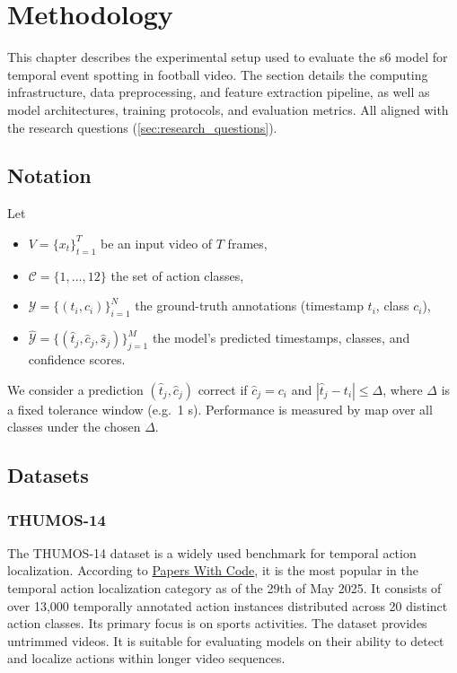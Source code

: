 \chapter{Methodology} 
\label{chap:methodology}
This chapter describes the experimental setup used to evaluate the \acrfull{s6} model for temporal event spotting in football video. The section details the computing infrastructure, data preprocessing, and feature extraction pipeline, as well as model architectures, training protocols, and evaluation metrics. All aligned with the research questions (\autoref{sec:research_questions}).



\section{Notation}
\label{sec:notation}
Let
\begin{itemize}
  \item $V=\{x_t\}_{t=1}^T$ be an input video of $T$ frames,
  \item $\mathcal{C}=\{1,\dots,12\}$ the set of action classes,
  \item $\mathcal{Y}=\{(t_i,c_i)\}_{i=1}^N$ the ground-truth annotations (timestamp $t_i$, class $c_i$),
  \item $\hat{\mathcal{Y}}=\{(\hat t_j,\hat c_j,\hat s_j)\}_{j=1}^M$ the model's predicted timestamps, classes, and confidence scores.
\end{itemize}
We consider a prediction $(\hat t_j,\hat c_j)$ correct if $\hat c_j=c_i$ and $|\hat t_j - t_i|\le\Delta$, where $\Delta$ is a fixed tolerance window (e.g.\ 1 s). Performance is measured by \acrfull{map} over all classes under the chosen $\Delta$.


\section{Datasets}
\label{sec:method_datasets}

\subsection{THUMOS-14}
\label{ssec:method_thumos14}
The THUMOS-14 dataset \cite{dataset:thumos} is a widely used benchmark for temporal action localization. According to \hyperlink{https://paperswithcode.com/dataset/thumos14-1}{Papers With Code}, it is the most popular in the temporal action localization category as of the 29th of May 2025. It consists of over 13,000 temporally annotated action instances distributed across 20 distinct action classes. Its primary focus is on sports activities. The dataset provides untrimmed videos. It is suitable for evaluating models on their ability to detect and localize actions within longer video sequences. 

